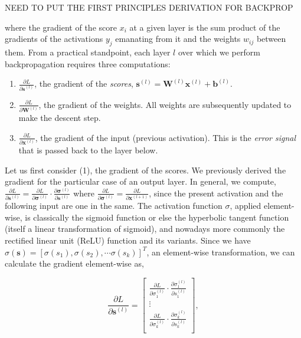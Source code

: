 NEED TO PUT THE FIRST PRINCIPLES DERIVATION FOR BACKPROP

where the gradient of the score $x_i$ at a given layer is the sum product of the gradients of the activations $y_j$ emanating from it and the weights $w_{ij}$ between them. From a practical standpoint, each layer $l$ over which we perform backpropagation requires three computations:

\begin{enumerate}
\item $\frac{\partial L}{\partial \mathbf{s}^{(l)}}$, the gradient of the \emph{scores}, $\mathbf{s}^{(l)} = \mathbf{W}^{(l)}\mathbf{x}^{(l)} + \mathbf{b}^{(l)}$.
\item $\frac{\partial L}{\partial \mathbf{W}^{(l)}}$, the gradient of the weights. All weights are subsequently updated to make the descent step.
\item $\frac{\partial L}{\partial \mathbf{x}^{(l)}}$, the gradient of the input (previous activation). This is the \emph{error signal} that is passed back to the layer below.
\end{enumerate}

Let us first consider (1), the gradient of the scores. We previously derived the gradient for the particular case of an output layer. In general, we compute, $\frac{\partial L}{\partial \mathbf{s}^{(l)}} = \frac{\partial L}{\partial \boldsymbol\sigma^{(l)}}\cdot\frac{\partial\boldsymbol\sigma^{(l)}}{\partial\mathbf{s}^{(l)}}$ where $\frac{\partial L}{\partial \boldsymbol\sigma^{(l)}} = \frac{\partial L}{\partial \mathbf{x}^{(l+1)}}$, since the present activation and the following input are one in the same. The activation function $\sigma$, applied element-wise, is classically the sigmoid function or else the hyperbolic tangent function (itself a linear transformation of sigmoid), and nowadays more commonly the rectified linear unit (ReLU) function and its variants. Since we have $\sigma(\mathbf{s}) = [\sigma(s_1), \sigma(s_2), \cdots \sigma(s_k)]^T$, an element-wise transformation, we can calculate the gradient element-wise as,

$$
\frac{\partial L}{\partial \mathbf{s}^{(l)}} =
\begin{bmatrix}
\frac{\partial L}{\partial\sigma_1^{(l)}}\cdot\frac{\partial\sigma_1^{(l)}}{\partial{s}_1^{(l)}} \\ 
\vdots \\
\frac{\partial L}{\partial\sigma_k^{(l)}}\cdot\frac{\partial\sigma_k^{(l)}}{\partial{s}_k^{(l)}} \\
\end{bmatrix},
$$

